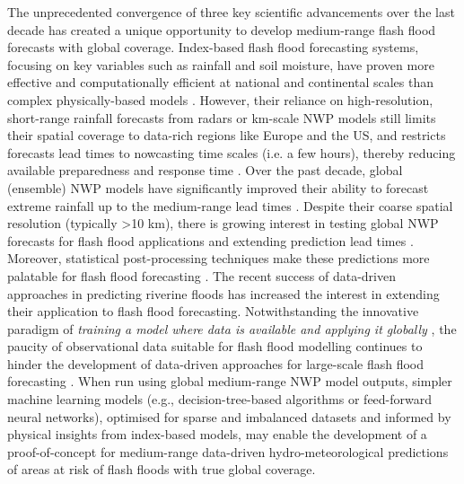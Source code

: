 The  unprecedented convergence of three key scientific advancements over the last decade has created a unique opportunity to develop medium-range flash flood forecasts with global coverage. Index-based flash flood forecasting systems, focusing on key variables such as rainfall and soil moisture, have proven more effective and computationally efficient at national and continental scales than complex physically-based models \citep{Alfieri_2015a}. However, their reliance on high-resolution, short-range rainfall forecasts from radars or km-scale NWP models still limits their spatial coverage to data-rich regions like Europe and the US, and restricts forecasts lead times to nowcasting time scales (i.e. a few hours), thereby reducing available preparedness and response time \citep{Luong_2021, Maybee_2024}. Over the past decade, global (ensemble) NWP models have significantly improved their ability to forecast extreme rainfall up to the medium-range lead times \citep{Lavers_2021, Haiden_2023}. Despite their coarse spatial resolution (typically >10 km), there is growing interest in testing global NWP forecasts for flash flood applications and extending prediction lead times \citep{Bucherie_2022b}. Moreover, statistical post-processing techniques make these predictions more palatable for flash flood forecasting \citep{Vannitsem_2021}. The recent success of data-driven approaches in predicting riverine floods \citep{Nearing_2024} has increased the interest in extending their application to flash flood forecasting. Notwithstanding the innovative paradigm of \textit{training a model where data is available and applying it globally} \citep{Kratzert_2024}, the paucity of observational data suitable for flash flood modelling continues to hinder the development of data-driven approaches for large-scale flash flood forecasting \citep{Alzubaidi_2023}. When run using global medium-range NWP model outputs, simpler machine learning models (e.g., decision-tree-based algorithms or feed-forward neural networks), optimised for sparse and imbalanced datasets and informed by physical insights from index-based models, may enable the development of a proof-of-concept for medium-range data-driven hydro-meteorological predictions of areas at risk of flash floods with true global coverage.


